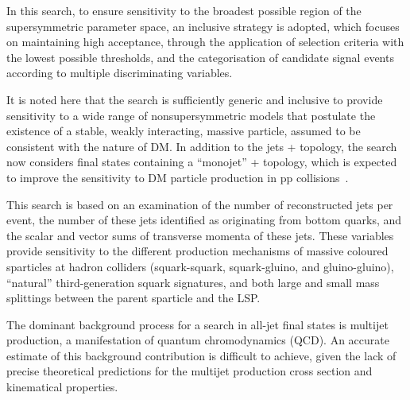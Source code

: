 In this search, to ensure sensitivity to the broadest possible region
of the supersymmetric parameter space, an inclusive strategy is
adopted, which focuses on maintaining high acceptance, through the
application of selection criteria with the lowest possible thresholds,
and the categorisation of candidate signal events according to
multiple discriminating variables. 

It is noted here that the search is sufficiently generic and inclusive
to provide sensitivity to a wide range of nonsupersymmetric models
that postulate the existence of a stable, weakly interacting, massive
particle, assumed to be consistent with the nature of DM. In addition
to the jets + \ptvecmiss topology, the search now considers final
states containing a ``monojet'' + \ptvecmiss topology, which is
expected to improve the sensitivity to DM particle production in pp
collisions~\cite{Fox:2012ee, Buchmueller:2015eea}. 

This search is based on an examination of the number of reconstructed
jets per event, the number of these jets identified as originating
from bottom quarks, and the scalar and vector sums of transverse
momenta of these jets. These variables provide sensitivity to the
different production mechanisms of massive coloured sparticles at
hadron colliders (\ie squark-squark, squark-gluino, and
gluino-gluino), ``natural'' third-generation squark signatures, and
both large and small mass splittings between the parent sparticle and
the LSP.

The dominant background process for a search in all-jet final states
is multijet production, a manifestation of quantum chromodynamics
(QCD). An accurate estimate of this background contribution is
difficult to achieve, given the lack of precise theoretical
predictions for the multijet production cross section and kinematical
properties. %

